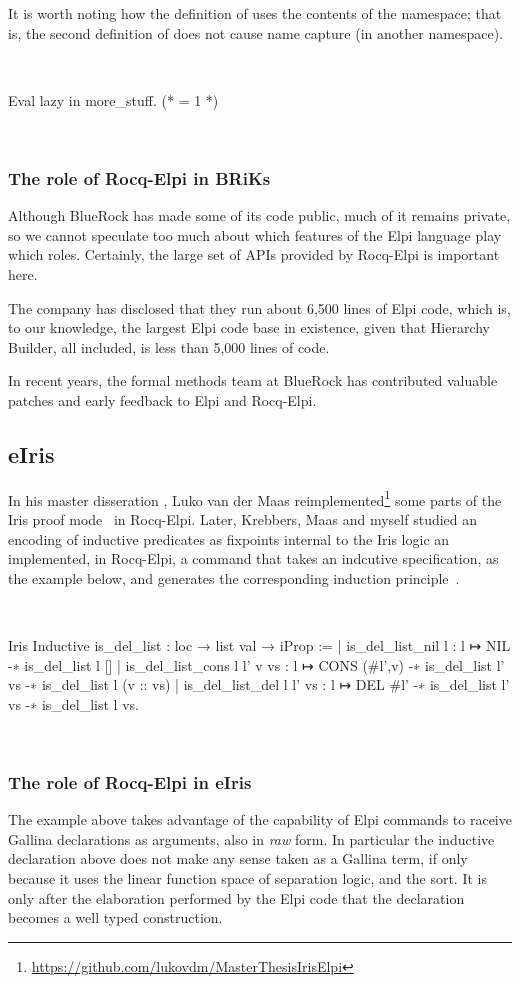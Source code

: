 \documentclass[a4paper, 11pt]{book}
\newenvironment{rocqcode}
  {\VerbatimEnvironment~\\\begin{rocqbox}\begin{xrocqcode}}{\end{xrocqcode}
\end{rocqbox}\\}
\begin{document}
It is worth noting how the definition of  uses the contents
of the namespace; that is, the second definition of  does not
cause name capture (in another namespace).

\begin{rocqcode}
Eval lazy in more_stuff. (* = 1 *)
\end{rocqcode}

\subsubsection{The role of Rocq-Elpi in BRiKs}

Although BlueRock has made some of its code public, much of it remains
private, so we cannot speculate too much about which features of the Elpi
language play which roles. Certainly, the large set of APIs provided by
Rocq-Elpi is important here.

The company has disclosed that they run about 6,500 lines of Elpi code, which
is, to our knowledge, the largest Elpi code base in existence, given that
Hierarchy Builder, all included, is less than 5,000 lines of code.

In recent years, the formal methods team at BlueRock has contributed valuable
patches and early feedback to Elpi and Rocq-Elpi.

\subsection{eIris}

In his master disseration \cite{Maas2024}, Luko van der Maas reimplemented\footnote{\url{https://github.com/lukovdm/MasterThesisIrisElpi}}
some parts of the Iris proof mode~\cite{10.1007/978-3-662-54434-1_26} in
Rocq-Elpi. Later, Krebbers, Maas and myself studied an encoding of inductive
predicates as fixpoints internal to the Iris logic an implemented,
in Rocq-Elpi, a command that takes an indcutive specification, as the example
below, and generates the corresponding induction principle~\cite{TODO}.

\begin{rocqcode}
Iris Inductive is_del_list : loc → list val → iProp :=
| is_del_list_nil l : l ↦ NIL -∗ is_del_list l []
| is_del_list_cons l l' v vs :
    l ↦ CONS (#l',v) -∗ is_del_list l' vs -∗ is_del_list l (v :: vs)
| is_del_list_del l l' vs :
    l ↦ DEL #l' -∗ is_del_list l' vs -∗ is_del_list l vs.
\end{rocqcode}

\subsubsection{The role of Rocq-Elpi in eIris}
The example above takes advantage of the capability of Elpi commands to
raceive Gallina declarations as arguments, also in \emph{raw} form.
In particular the inductive declaration above does not make any sense
taken as a Gallina term, if only because it uses the linear function
space of separation logic, and the  sort.
It is only after the elaboration performed by
the Elpi code that the declaration becomes a well typed construction.
\end{document}
